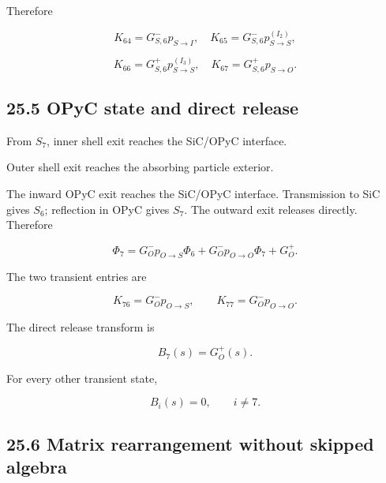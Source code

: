 \documentclass[11pt,a4paper]{article}
\begin{document}
Therefore

\begin{equation}
K_{64}=G_{S,6}^-p_{S\rightarrow I},
\quad
K_{65}=G_{S,6}^-p_{S\rightarrow S}^{(I_2)},
\tag{TRISO-MR-047}
\label{eq:triso-mr-047}
\end{equation}

\begin{equation}
K_{66}=G_{S,6}^+p_{S\rightarrow S}^{(I_3)},
\quad
K_{67}=G_{S,6}^+p_{S\rightarrow O}.
\tag{TRISO-MR-048}
\label{eq:triso-mr-048}
\end{equation}

\subsection*{25.5 OPyC state and direct release}

From $S_7$, inner shell exit reaches the SiC/OPyC interface.

Outer shell exit reaches the absorbing particle exterior.

The inward OPyC exit reaches the SiC/OPyC interface. Transmission to SiC gives $S_6$; reflection in OPyC gives $S_7$. The outward exit releases directly. Therefore

\begin{equation}
\Phi_7=
G_O^-p_{O\rightarrow S}\Phi_6+
G_O^-p_{O\rightarrow O}\Phi_7+
G_O^+.
\tag{TRISO-MR-049}
\label{eq:triso-mr-049}
\end{equation}

The two transient entries are

\begin{equation}
K_{76}=G_O^-p_{O\rightarrow S},
\qquad
K_{77}=G_O^-p_{O\rightarrow O}.
\tag{TRISO-MR-050}
\label{eq:triso-mr-050}
\end{equation}

The direct release transform is

\begin{equation}
\boxed{
B_7(s)=G_O^+(s).
}
\tag{TRISO-MR-020}
\label{eq:triso-mr-020}
\end{equation}

For every other transient state,

\begin{equation}
B_i(s)=0,
\qquad i\ne7.
\tag{TRISO-MR-021}
\label{eq:triso-mr-021}
\end{equation}

\subsection*{25.6 Matrix rearrangement without skipped algebra}
\end{document}
